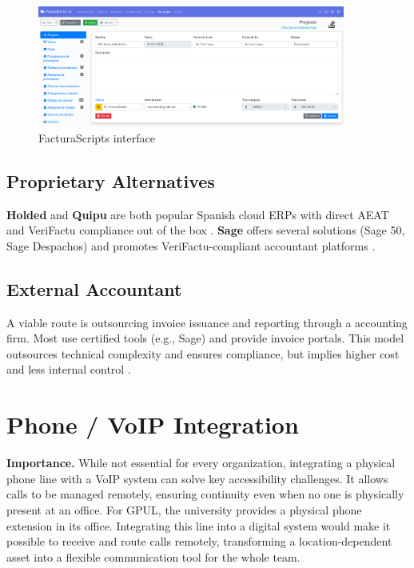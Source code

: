 \begin{figure}[H]
  \centering
  \includegraphics[width=0.9\textwidth]{imaxes/facturascripts-ui.png}
  \caption{FacturaScripts interface}
  \label{fig:facturascripts-ui}
\end{figure}

\subsection*{Proprietary Alternatives}

\textbf{Holded} and \textbf{Quipu} are both popular Spanish cloud ERPs with direct AEAT and VeriFactu compliance out of the box \cite{HoldedVerifactu, QuipuVerifactu}. \textbf{Sage} offers several solutions (Sage 50, Sage Despachos) and promotes VeriFactu-compliant accountant platforms \cite{SageVerifactu, SageBlogAsesoria}.

\subsection*{External Accountant}
A viable route is outsourcing invoice issuance and reporting through a accounting firm. Most use certified tools (e.g., Sage) and provide invoice portals. This model outsources technical complexity and ensures compliance, but implies higher cost and less internal control \cite{SageBlogAsesoria}.

\section{Phone / VoIP Integration}

\textbf{Importance.} While not essential for every organization, integrating a physical phone line with a VoIP system can solve key accessibility challenges. It allows calls to be managed remotely, ensuring continuity even when no one is physically present at an office. For GPUL, the university provides a physical phone extension in its office. Integrating this line into a digital system would make it possible to receive and route calls remotely, transforming a location-dependent asset into a flexible communication tool for the whole team.

